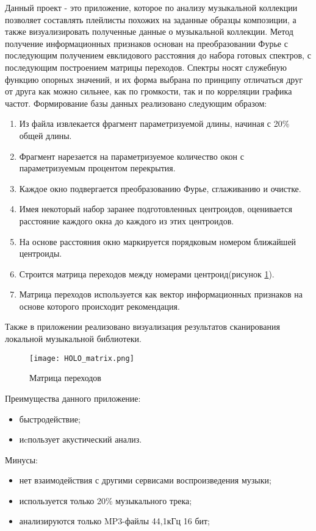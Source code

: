 Данный проект - это приложение, которое по анализу музыкальной коллекции позволяет составлять плейлисты похожих на заданные образцы композиции, а также визуализировать полученные данные о музыкальной коллекции\cite{holo_blog}. Метод получение информационных признаков основан на преобразовании Фурье с последующим получением евклидового расстояния до набора готовых спектров, с последующим построением матрицы переходов. Спектры носят служебную функцию опорных значений, и их форма выбрана по принципу отличаться друг от друга как можно сильнее, как по громкости, так и по корреляции графика частот.
Формирование базы данных реализовано следующим образом:
\begin{enumerate}[label=\arabic*.]
\item Из файла извлекается фрагмент параметризуемой длины, начиная с 20\% общей длины.
\item Фрагмент нарезается на параметризуемое количество окон с параметризуемым процентом перекрытия.
\item Каждое окно подвергается преобразованию Фурье, сглаживанию и очистке.
\item Имея некоторый набор заранее подготовленных центроидов, оценивается расстояние каждого окна до каждого из этих центроидов.
\item На основе расстояния окно маркируется порядковым номером ближайшей центроиды.
\item Строится матрица переходов между номерами центроид(рисунок \ref{fig:domain:holo:matrix}).
\item Матрица переходов используется как вектор информационных признаков на основе которого происходит рекомендация.
\end{enumerate}
Также в приложении реализовано визуализация результатов сканирования локальной музыкальной библиотеки.

\begin{figure}
\centering
  \texttt{[image: HOLO\_matrix.png]}  
  \caption{Матрица переходов}
  \label{fig:domain:holo:matrix}
\end{figure}

Преимущества данного приложение:
\begin{itemize}
\item быстродействие;
\item иcпользует акустический анализ.
\end{itemize}
Минусы:
\begin{itemize}
\item нет взаимодействия с другими сервисами воспроизведения музыки;
\item используется только 20\% музыкального трека;
\item анализируются только MP3-файлы 44,1кГц 16 бит;
\end{itemize}

